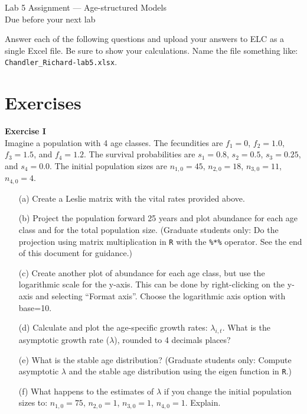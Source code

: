 \documentclass[12pt]{article}\usepackage[]{graphicx}\usepackage[]{color}
\begin{document}
{
  \Large
  \centering
  Lab 5 Assignment --- Age-structured Models \\
  Due before your next lab \par
}

\vspace{12pt}

Answer each of the following questions and upload your answers to ELC
as a single Excel file. Be sure to show your calculations. Name the
file something like: \texttt{Chandler\_Richard-lab5.xlsx}. \\

\section*{Exercises}


{\bf Exercise I \\}
Imagine a population with 4 age classes. The fecundities are $f_1=0$,
$f_2=1.0$, $f_3=1.5$, and $f_4=1.2$. The survival probabilities are
$s_1=0.8$, $s_2=0.5$, $s_3=0.25$, and $s_4=0.0$. The initial
population sizes are $n_{1,0}=45$, $n_{2,0}=18$, $n_{3,0}=11$, $n_{4,0}=4$.
\begin{itemize}
  \item[(a)] Create a Leslie matrix with the vital rates provided above.
  \item[(b)] Project the population forward 25 years and plot abundance for
    each age class and for the total population size. (Graduate students
    only: Do the projection using matrix multiplication in {\tt R} with
    the \texttt{\%*\%} operator. See the end of this document for
    guidance.)
  \item[(c)] Create another plot of abundance for each age class, but use the
    logarithmic scale for the y-axis. This can be done by right-clicking
    on the y-axis and selecting ``Format axis''. Choose the logarithmic
    axis option with base=10.
  \item[(d)] Calculate and plot the age-specific
    growth rates: $\lambda_{i,t}$. What is the asymptotic growth rate
    ($\lambda$), rounded to 4 decimals places?
  \item[(e)] What is the stable age distribution? (Graduate students only:
    Compute asymptotic $\lambda$ and the stable age distribution using
    the eigen function in {\tt R}.)
  \item[(f)] What happens to the estimates of $\lambda$ if you change the
    initial population sizes to: $n_{1,0}=75$, $n_{2,0}=1$, $n_{3,0}=1$,
    $n_{4,0}=1$. Explain.
\end{itemize}
\end{document}

